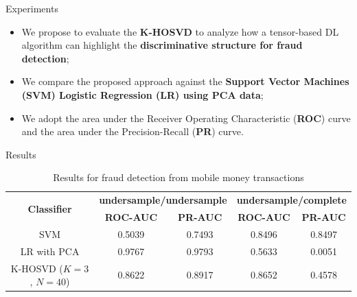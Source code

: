 \documentclass[newPxFont, numfooter, sectionpages]{beamer}
\begin{document}
\begin{frame}[c]{Experiments}

	\begin{itemize}
		\item We propose to evaluate the \textbf{K-HOSVD} to analyze how a tensor-based DL algorithm can highlight the \textbf{discriminative structure for fraud detection};
		\item We compare the proposed approach against the \textbf{Support Vector Machines (SVM) Logistic Regression (LR) using PCA data};
		\item We adopt the area under the Receiver Operating Characteristic (\textbf{ROC}) curve and the area under the Precision-Recall (\textbf{PR}) curve.
	\end{itemize}

\end{frame}
\begin{frame}[c]{Results}

	\begin{table}[h!]
	  \centering
	  \scriptsize
	  \caption{Results for fraud detection from mobile money transactions} 
	  \label{tab:4_tab1}
	  \begin{tabular}{ c c c c c }
		\toprule
		\multirow{2}{*}{\textbf{Classifier}}   &\multicolumn{2}{c}{\textbf{undersample/undersample}} &\multicolumn{2}{c}{\textbf{undersample/complete}}\\ 
				\hhline{~----}
				&\textbf{ROC-AUC} &\textbf{PR-AUC} &\textbf{ROC-AUC} &\textbf{PR-AUC}\\
		\midrule
		SVM &0.5039 &0.7493 &0.8496 &\color{red}0.8497 \\
		LR with PCA &\color{red}0.9767 &\color{red}0.9793 &0.5633 &0.0051 \\
		K-HOSVD ($K=3$, $N=40$) &0.8622 &0.8917 &\color{red}0.8652 &0.4578 \\
	    \bottomrule
	  \end{tabular}
	\end{table}

\end{frame}
\end{document}
